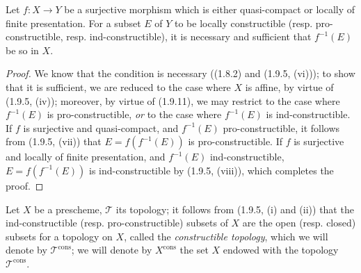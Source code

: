 \begin{corollary}[1.9.12]
\label{IV.1.9.12}
Let $f:X\to Y$ be a surjective morphism which is either quasi-compact or
locally of finite presentation. For a subset $E$ of $Y$ to be
locally constructible (resp. pro-constructible, resp. ind-constructible),
it is necessary and sufficient that $f^{-1}(E)$ be so in $X$.
\end{corollary}


\begin{proof}
We know that the condition is necessary ((1.8.2) and (1.9.5, (vi))); to
show that it is sufficient, we are reduced to the case where $X$ is affine,
by virtue of (1.9.5, (iv)); moreover, by virtue of (1.9.11), we may restrict
to the case where $f^{-1}(E)$ is pro-constructible, \emph{or} to the case
where $f^{-1}(E)$ is ind-constructible. If $f$ is surjective and
quasi-compact, and $f^{-1}(E)$ pro-constructible, it follows from (1.9.5,
(vii)) that $E=f(f^{-1}(E))$ is pro-constructible. If $f$ is surjective and
locally of finite presentation, and $f^{-1}(E)$ ind-constructible,
$E=f(f^{-1}(E))$ is ind-constructible by (1.9.5, (viii)), which completes the
proof.
\end{proof}

\begin{env}[1.9.13]
\label{IV.1.9.13}
Let $X$ be a prescheme, $\mathscr T$ its topology; it follows from (1.9.5,
(i) and (ii)) that the ind-constructible (resp. pro-constructible) subsets of
$X$ are the open (resp. closed) subsets for a topology on $X$,
called the \emph{constructible topology}, which we will denote by
$\mathscr T^{\mathrm{cons}}$; we will denote by $X^{\mathrm{cons}}$
the set $X$ endowed with the topology $\mathscr T^{\mathrm{cons}}$.
\end{env}

